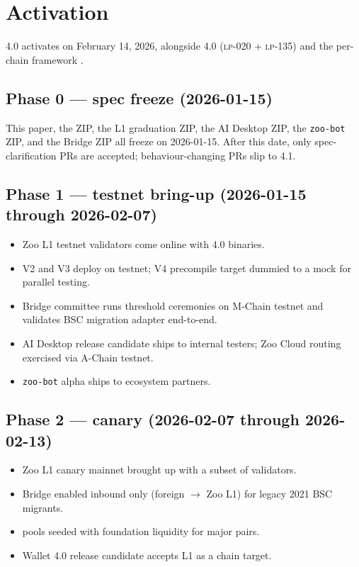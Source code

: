 \section{Activation}
\label{sec:activation}

\Zoo{} 4.0 activates on February 14, 2026, alongside \Lux{}
\Quasar{} 4.0 (\textsc{lp-020} + \textsc{lp-135}) and the per-\LLM{}
chain framework \cite{zoo-per-llm-chains}.

\subsection{Phase 0 --- spec freeze (2026-01-15)}

This paper, the \Zoo{} \DEX{} ZIP, the \Zoo{} L1 graduation ZIP, the
\Zoo{} AI Desktop ZIP, the \texttt{zoo-bot} ZIP, and the \Zoo{} Bridge
ZIP all freeze on 2026-01-15. After this date, only spec-clarification
PRs are accepted; behaviour-changing PRs slip to 4.1.

\subsection{Phase 1 --- testnet bring-up (2026-01-15 through 2026-02-07)}

\begin{itemize}[leftmargin=1.2em]
  \item Zoo L1 testnet validators come online with \Quasar{} 4.0
        binaries.
  \item \Zoo{} \DEX{} V2 and V3 deploy on testnet; V4 precompile
        target dummied to a mock \Lux{} \DEX{} for parallel testing.
  \item \Zoo{} Bridge committee runs threshold ceremonies on M-Chain
        testnet and validates BSC migration adapter end-to-end.
  \item \Zoo{} AI Desktop release candidate ships to internal testers;
        Zoo Cloud routing exercised via A-Chain testnet.
  \item \texttt{zoo-bot} alpha ships to ecosystem partners.
\end{itemize}

\subsection{Phase 2 --- canary (2026-02-07 through 2026-02-13)}

\begin{itemize}[leftmargin=1.2em]
  \item Zoo L1 canary mainnet brought up with a subset of validators.
  \item Bridge enabled inbound only (foreign $\rightarrow$ Zoo L1) for
        legacy 2021 BSC migrants.
  \item \Zoo{} \DEX{} pools seeded with foundation liquidity for major
        pairs.
  \item \Lux{} Wallet 4.0 release candidate accepts \Zoo{} L1 as a
        chain target.
\end{itemize}

